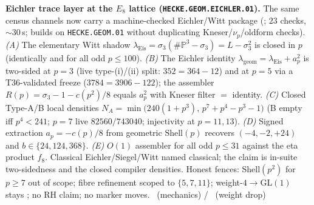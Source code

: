 \par\smallskip\noindent\textbf{Eichler trace layer at the $E_8$ lattice
(\texttt{HECKE.GEOM.EICHLER.01}).}
The same census channels now carry a machine-checked Eichler/Witt package
(; $23$ checks, $\sim30$\,s; builds on
\texttt{HECKE.GEOM.01} without duplicating Kneser/$\nu_p$/oldform checks).
\emph{(A)} The elementary Witt shadow
$\lambda_{\mathrm{Eis}}=\sigma_3(\#\mathbb P^3-\sigma_3)=L-\sigma_3^2$ is closed in $p$
(identically and for all odd $p\le100$).
\emph{(B)} The Eichler identity $\lambda_{\mathrm{geom}}=\lambda_{\mathrm{Eis}}+a_p^2$ is
two-sided at $p=3$ (live type-(i)/(ii) split: $352=364-12$) and at $p=5$ via a T36-validated
freeze ($3784=3906-122$); the assembler $R(p)=\sigma_3-1-c(p^2)/8$ equals $a_p^2$ with
Kneser filter $=$ identity.
\emph{(C)} Closed Type-A/B local densities
$N_A=\min\bigl(240(1+p^3),\,p^7+p^4-p^3-1\bigr)$ (B empty iff $p^4<241$; $p=7$ live
$82560/743040$; injectivity at $p=11,13$).
\emph{(D)} Signed extraction $a_p=-c(p)/8$ from geometric $\mathrm{Shell}(p)$ recovers
$(-4,-2,+24)$ and $b\in\{24,124,368\}$.
\emph{(E)} $O(1)$ assembler for all odd $p\le31$ against the eta product $f_8$.
Classical Eichler/Siegel/Witt named classical; the claim is in-suite two-sidedness and the
closed compiler densities. Honest fences: $\mathrm{Shell}(p^2)$ for $p\ge7$ out of scope;
fibre refinement scoped to $\{5,7,11\}$; weight-$4\to$GL$(1)$ stays \mO; no RH claim; no
marker moves. \mE\ (mechanics) / \mO\ (weight drop)


